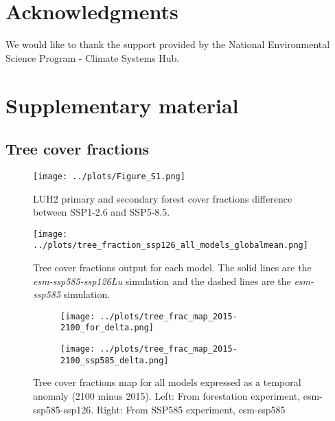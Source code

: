 \documentclass[]{article}
\begin{document}
\section{Acknowledgments}
We would like to thank the support provided by the National Environmental Science Program - Climate Systems Hub.

\printbibliography

\section{Supplementary material}
\setcounter{figure}{0}

\subsection{Tree cover fractions}

\begin{figure}[H]
    \centering
    \texttt{[image: ../plots/Figure\_S1.png]}
    \caption{LUH2 primary and secondary forest cover fractions difference between SSP1-2.6 and SSP5-8.5.}
    \label{fig:LUH2DIFF}
\end{figure}

\begin{figure}[H]
    \centering
    \texttt{[image: ../plots/tree\_fraction\_ssp126\_all\_models\_globalmean.png]}
    \caption{Tree cover fractions output for each model. The solid lines are the \textit{esm-ssp585-ssp126Lu} simulation and the dashed lines are the \textit{esm-ssp585} simulation.}
    \label{fig:tree_fractions_models}
\end{figure}

\begin{figure}[H]
    \centering
    \begin{subfigure}[b]{0.4\linewidth}
        \texttt{[image: ../plots/tree\_frac\_map\_2015-2100\_for\_delta.png]}
    \end{subfigure}
    \begin{subfigure}[b]{0.4\linewidth}
        \texttt{[image: ../plots/tree\_frac\_map\_2015-2100\_ssp585\_delta.png]}
    \end{subfigure}
    \caption{Tree cover fractions map for all models expressed as a temporal anomaly (2100 minus 2015). Left: From forestation experiment, esm-ssp585-ssp126. Right: From SSP585 experiment, esm-ssp585}
    \label{fig:tree_area_maps_ssp126Lu}
\end{figure}
\end{document}
